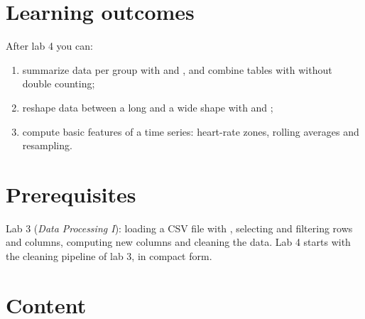 \documentclass[11pt,a4paper]{article}
\begin{document}



\section{Learning outcomes}

After lab 4 you can:

\begin{enumerate}[label=\textbf{LO\arabic*}, leftmargin=1.4cm]
  \item summarize data per group with  and , and
        combine tables with  without double counting;
  \item reshape data between a long and a wide shape with 
        and ;
  \item compute basic features of a time series: heart-rate zones,
        rolling averages and resampling.
\end{enumerate}

\section{Prerequisites}

Lab 3 (\emph{Data Processing I}): loading a CSV file with ,
selecting and filtering rows and columns, computing new columns and
cleaning the data. Lab 4 starts with the cleaning pipeline of lab 3, in
compact form.





\section{Content}



\end{document}
